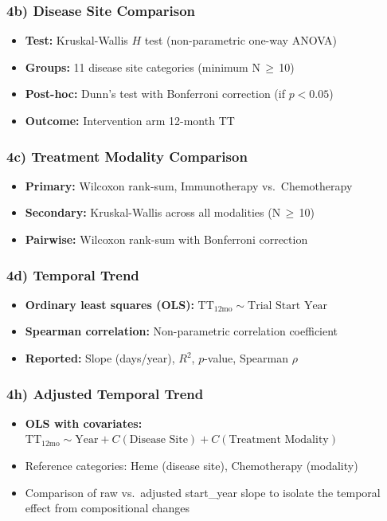 \documentclass[11pt,a4paper]{article}
\begin{document}
\subsubsection{4b) Disease Site Comparison}
\begin{itemize}
    \item \textbf{Test:} Kruskal-Wallis $H$ test (non-parametric one-way ANOVA)
    \item \textbf{Groups:} 11 disease site categories (minimum N\,$\geq$\,10)
    \item \textbf{Post-hoc:} Dunn's test with Bonferroni correction (if $p<0.05$)
    \item \textbf{Outcome:} Intervention arm 12-month TT
\end{itemize}

\subsubsection{4c) Treatment Modality Comparison}
\begin{itemize}
    \item \textbf{Primary:} Wilcoxon rank-sum, Immunotherapy vs.\ Chemotherapy
    \item \textbf{Secondary:} Kruskal-Wallis across all modalities (N\,$\geq$\,10)
    \item \textbf{Pairwise:} Wilcoxon rank-sum with Bonferroni correction
\end{itemize}

\subsubsection{4d) Temporal Trend}
\begin{itemize}
    \item \textbf{Ordinary least squares (OLS):} $\text{TT}_{\text{12mo}} \sim \text{Trial Start Year}$
    \item \textbf{Spearman correlation:} Non-parametric correlation coefficient
    \item \textbf{Reported:} Slope (days/year), $R^2$, $p$-value, Spearman $\rho$
\end{itemize}

\subsubsection{4h) Adjusted Temporal Trend}
\begin{itemize}
    \item \textbf{OLS with covariates:} $\text{TT}_{\text{12mo}} \sim \text{Year} + C(\text{Disease Site}) + C(\text{Treatment Modality})$
    \item Reference categories: Heme (disease site), Chemotherapy (modality)
    \item Comparison of raw vs.\ adjusted start\_year slope to isolate the temporal effect from compositional changes
\end{itemize}
\end{document}
